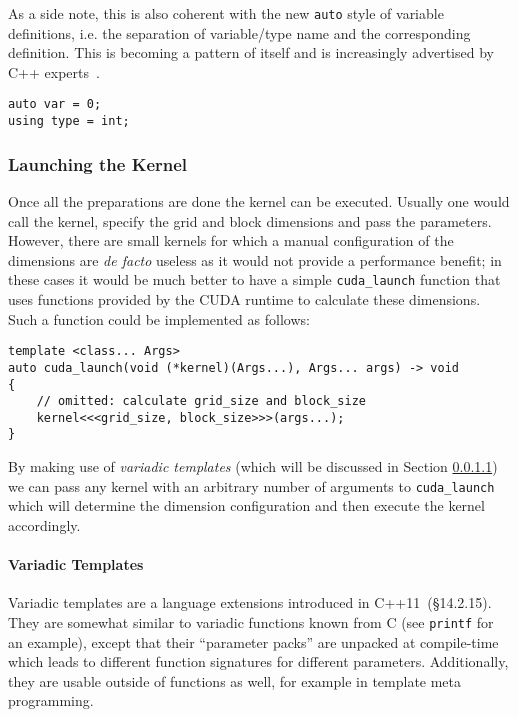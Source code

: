 As a side note, this is also coherent with the new \texttt{auto} style of variable definitions, i.e. the separation of variable/type name and the corresponding definition. This is becoming a pattern of itself and is increasingly advertised by C++ experts~\cite{sutter_cppcon}.

\begin{lstlisting}
auto var = 0;
using type = int;
\end{lstlisting}

\subsubsection{Launching the Kernel}

Once all the preparations are done the kernel can be executed. Usually one would call the kernel, specify the grid and block dimensions and pass the parameters. However, there are small kernels for which a manual configuration of the dimensions are \textit{de facto} useless as it would not provide a performance benefit; in these cases it would be much better to have a simple \texttt{cuda\_launch} function that uses functions provided by the CUDA runtime to calculate these dimensions. Such a function could be implemented as follows:

\begin{lstlisting}
template <class... Args>
auto cuda_launch(void (*kernel)(Args...), Args... args) -> void
{
    // omitted: calculate grid_size and block_size
    kernel<<<grid_size, block_size>>>(args...);
}
\end{lstlisting}

By making use of \textit{variadic templates} (which will be discussed in Section \ref{vec_add:variadic_templates}) we can pass any kernel with an arbitrary number of arguments to \texttt{cuda\_launch} which will determine the dimension configuration and then execute the kernel accordingly.

\paragraph{Variadic Templates}\label{vec_add:variadic_templates}

Variadic templates are a language extensions introduced in C++11~\cite{cpp11std}(§14.2.15). They are somewhat similar to variadic functions known from C (see \texttt{printf} for an example), except that their ``parameter packs'' are unpacked at compile-time which leads to different function signatures for different parameters. Additionally, they are usable outside of functions as well, for example in template meta programming.


